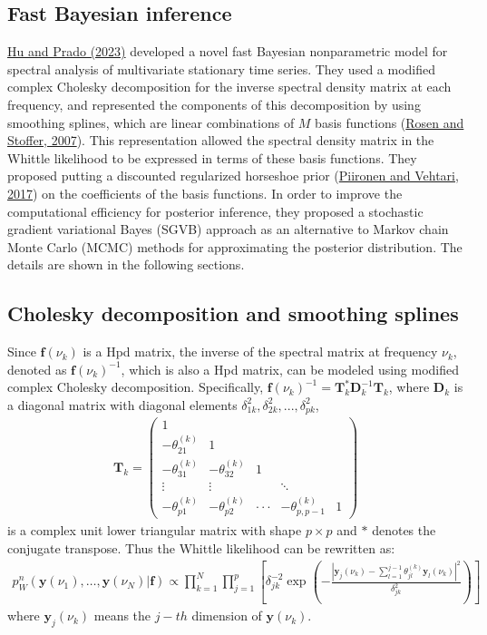 \documentclass[12pt,a4paper]{article}
\begin{document}
\subsection{Fast Bayesian inference}
\hyperref[hu2023]{Hu and Prado (2023)} developed a novel fast Bayesian nonparametric model for spectral analysis of multivariate stationary time series. They used a modified complex Cholesky decomposition for the inverse spectral density matrix at each frequency, and represented the components of this decomposition by using smoothing splines, which are linear combinations of $M$ basis functions (\hyperref[rosen-stoffer-2007]{Rosen and Stoffer, 2007}). This representation allowed the spectral density matrix in the Whittle likelihood to be expressed in terms of these basis functions. They proposed putting a discounted regularized horseshoe prior (\hyperref[pii2017]{Piironen and Vehtari, 2017}) on the coefficients of the basis functions. In order to improve the computational efficiency for posterior inference, they proposed a stochastic gradient variational Bayes (SGVB) approach as an alternative to Markov chain Monte Carlo (MCMC) methods for approximating the posterior distribution. The details are shown in the following sections.





\subsection{Cholesky decomposition and smoothing splines}
Since $\bm{f}(\nu_k)$ is a Hpd matrix, the inverse of the spectral matrix at frequency $\nu_k$, denoted as $\bm{f}(\nu_k)^{-1}$, which is also a Hpd matrix, can be modeled using modified complex Cholesky decomposition. Specifically, $\bm{f}(\nu_k)^{-1} = \mathbf{T}_k^* \mathbf{D}_k^{-1} \mathbf{T}_k$, where $\mathbf{D}_k$ is a diagonal matrix with diagonal elements $\delta_{1k}^2, \delta_{2k}^2, ..., \delta_{pk}^2$,
\begin{align*}
\mathbf{T}_k = \begin{pmatrix}1\\-\theta_{21}^{(k)} & 1 \\ -\theta_{31}^{(k)} & -\theta_{32}^{(k)} & 1\\\vdots &\vdots & &\ddots \\
-\theta_{p1}^{(k)} &-\theta_{p2}^{(k)} & \cdot\cdot\cdot& -\theta_{p,p-1}^{(k)} &1
\end{pmatrix}
\end{align*}
is a complex unit lower triangular matrix with shape $p \times p$ and $*$ denotes the conjugate transpose. Thus the Whittle likelihood can be rewritten as:
\begin{align}
p^{n}_W(\mathbf{y}(\nu_1), \ldots, \mathbf{y}(\nu_N)| \bm{f})
\propto \prod_{k=1}^{N}\prod_{j=1}^{p} \left[\delta_{jk}^{-2} \exp \left(-\frac{\left|\mathbf{y}_j(\nu_k)-\sum_{l=1}^{j-1}\theta_{jl}^{(k)}\mathbf{y}_l(\nu_k) \right|^2}{\delta_{jk}^2} \right) \right]
\label{sgvb likeli}
\end{align}
where $\mathbf{y}_j(\nu_k)$ means the $j-th$ dimension of $\mathbf{y}(\nu_k)$.
\end{document}
